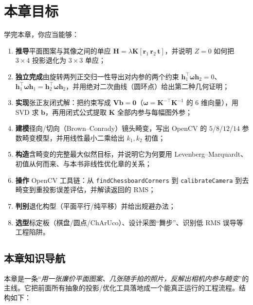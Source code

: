 \section*{本章目标}
学完本章，你应当能够：
\begin{enumerate}
  \item \textbf{推导}平面图案与其像之间的单应 $\mathbf{H}=\lambda\mathbf{K}[\mathbf{r}_1\,\mathbf{r}_2\,\mathbf{t}]$，并说明 $Z=0$ 如何把 $3\times4$ 投影退化为 $3\times3$ 单应；
  \item \textbf{独立完成}由旋转两列正交归一性导出对内参的两个约束 $\mathbf{h}_1^\top\boldsymbol{\omega}\mathbf{h}_2=0$、$\mathbf{h}_1^\top\boldsymbol{\omega}\mathbf{h}_1=\mathbf{h}_2^\top\boldsymbol{\omega}\mathbf{h}_2$，并用绝对二次曲线（圆环点）给出第二种几何证明；
  \item \textbf{实现}张正友闭式解：把约束写成 $\mathbf{V}\mathbf{b}=\mathbf{0}$（$\boldsymbol{\omega}=\mathbf{K}^{-\top}\mathbf{K}^{-1}$ 的 $6$ 维向量），用 SVD 求 $\mathbf{b}$，再用闭式公式提取 $\mathbf{K}$ 全部内参与每幅图外参；
  \item \textbf{建模}径向/切向（Brown--Conrady）镜头畸变，写出 OpenCV 的 $5$/$8$/$12$/$14$ 参数畸变模型，并用线性最小二乘给出 $k_1,k_2$ 初值；
  \item \textbf{构造}含畸变的完整最大似然目标，并说明它为何要用 Levenberg--Marquardt、初值从何而来、与本书非线性优化章的关系；
  \item \textbf{操作} OpenCV 工具链：从 \texttt{findChessboardCorners} 到 \texttt{calibrateCamera} 到去畸变到重投影误差评估，并解读返回的 RMS；
  \item \textbf{判别}退化构型（平面平行/纯平移）并给出规避办法；
  \item \textbf{选型}标定板（棋盘/圆点/ChArUco）、设计采图“舞步”、识别低 RMS 误导等工程陷阱。
\end{enumerate}

\subsection*{本章知识导航}
本章是一条“\emph{用一张廉价平面图案、几张随手拍的照片，反解出相机内参与畸变}”的主线。它把前面所有抽象的投影/优化工具落地成一个能真正运行的工程流程。结构如下：

